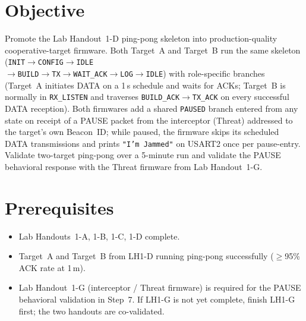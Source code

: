 \documentclass[11pt,letterpaper]{article}
\begin{document}

\section{Objective}
Promote the Lab Handout~1-D ping-pong skeleton into production-quality cooperative-target firmware. Both Target~A and Target~B run the same \FSM{} skeleton (\texttt{INIT}$\to$\texttt{CONFIG}$\to$\texttt{IDLE} \\ $\to$\texttt{BUILD}$\to$\texttt{TX}$\to$\texttt{WAIT\_ACK}$\to$\texttt{LOG}$\to$\texttt{IDLE}) with role-specific branches (Target~A initiates DATA on a 1\,s schedule and waits for ACKs; Target~B is normally in \texttt{RX\_LISTEN} and traverses \texttt{BUILD\_ACK}$\to$\texttt{TX\_ACK} on every successful DATA reception). Both firmwares add a shared \texttt{PAUSED} branch entered from any state on receipt of a PAUSE packet from the interceptor (Threat) addressed to the target's own Beacon~ID; while paused, the firmware skips its scheduled DATA transmissions and prints \texttt{"I'm Jammed"} on USART2 once per pause-entry. Validate two-target ping-pong over a 5-minute run and validate the PAUSE behavioral response with the Threat firmware from Lab Handout~1-G.

\section{Prerequisites}
\begin{itemize}[leftmargin=2em]
	\item Lab Handouts~1-A, 1-B, 1-C, 1-D complete.
	\item Target~A and Target~B from LH1-D running ping-pong successfully ($\geq$95\% ACK rate at 1\,m).
	\item Lab Handout~1-G (interceptor / Threat firmware) is required for the PAUSE behavioral validation in Step~7. If LH1-G is not yet complete, finish LH1-G first; the two handouts are co-validated.
\end{itemize}
\end{document}
